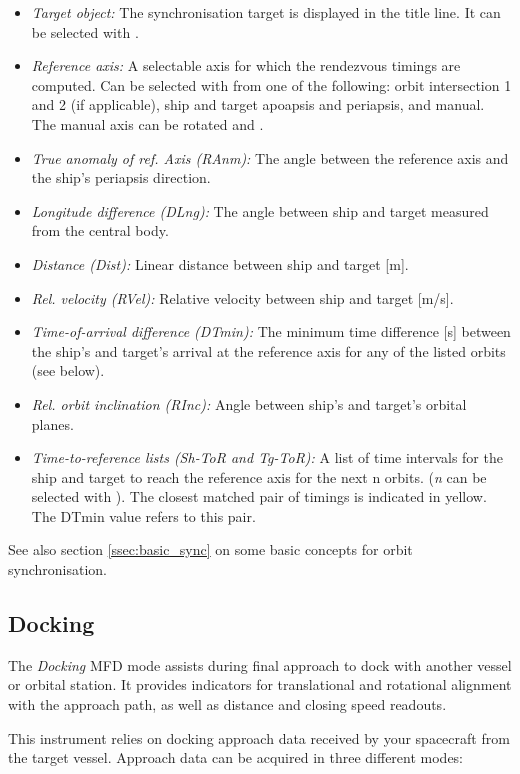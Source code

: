 \documentclass[Orbiter User Manual.tex]{subfiles}
\begin{document}
\begin{itemize}
	\item \emph{Target object:} The synchronisation target is displayed in the
		title line. It can be selected with .
	\item \emph{Reference axis:} A selectable axis for which the rendezvous
		timings are computed. Can be selected with  from one of the
		following: orbit intersection 1 and 2 (if applicable), ship and target
		apoapsis and periapsis, and manual. The manual axis can be rotated
		\mfdkey{,} and .
	\item \emph{True anomaly of ref. Axis (RAnm):} The angle between the
		reference axis and the ship's periapsis direction.
	\item \emph{Longitude difference (DLng):} The angle between ship and target
		measured from the central body.
	\item \emph{Distance (Dist):} Linear distance between ship and target [m].
	\item \emph{Rel. velocity (RVel):} Relative velocity between ship and target
		[m/s].
	\item \emph{Time-of-arrival difference (DTmin):} The minimum time difference
		[s] between the ship's and target's arrival at the reference axis for
		any of the listed orbits (see below).
	\item \emph{Rel. orbit inclination (RInc):} Angle between ship's and
		target's orbital planes.
	\item \emph{Time-to-reference lists (Sh-ToR and Tg-ToR):} A list of time
		intervals for the ship and target to reach the reference axis for the
		next n orbits. (\textit{n} can be selected with ).
		The closest matched pair of timings is indicated in yellow. The DTmin
		value refers to this pair.
\end{itemize}

See also section \ref{ssec:basic_sync} on some basic concepts for orbit
synchronisation.


\subsection{Docking}
The \textit{Docking} MFD mode assists during final approach to dock with another
vessel or orbital station. It provides indicators for translational and
rotational alignment with the approach path, as well as distance and closing
speed readouts.

This instrument relies on docking approach data received by your spacecraft from
the target vessel. Approach data can be acquired in three different modes:
\end{document}
